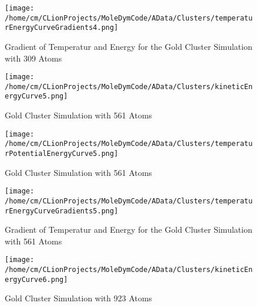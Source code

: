 \begin{figure}[!h] 
    \begin{center} 
        \texttt{[image: /home/cm/CLionProjects/MoleDymCode/AData/Clusters/temperaturEnergyCurveGradients4.png]} 
    \end{center} 
    \caption[Gradient of Temperatur and Energy for the Gold Cluster Simulation with 309 Atoms]{Gradient of Temperatur and Energy for the Gold Cluster Simulation with 309 Atoms} 
    \label{GoldClusterSimulationGradient309} 
\end{figure} 
 
\begin{figure}[!h] 
    \begin{center} 
        \texttt{[image: /home/cm/CLionProjects/MoleDymCode/AData/Clusters/kineticEnergyCurve5.png]} 
    \end{center} 
    \caption[Gold Cluster Simulation with 561 Atoms]{Gold Cluster Simulation with 561 Atoms} 
    \label{GoldClusterSimulationKineticTime561} 
\end{figure} 
 
\begin{figure}[!h] 
    \begin{center} 
        \texttt{[image: /home/cm/CLionProjects/MoleDymCode/AData/Clusters/temperaturPotentialEnergyCurve5.png]} 
    \end{center} 
    \caption[Gold Cluster Simulation with 561 Atoms]{Gold Cluster Simulation with 561 Atoms} 
    \label{GoldClusterSimulationTemperaturEnergy561} 
\end{figure} 
 
\begin{figure}[!h] 
    \begin{center} 
        \texttt{[image: /home/cm/CLionProjects/MoleDymCode/AData/Clusters/temperaturEnergyCurveGradients5.png]} 
    \end{center} 
    \caption[Gradient of Temperatur and Energy for the Gold Cluster Simulation with 561 Atoms]{Gradient of Temperatur and Energy for the Gold Cluster Simulation with 561 Atoms} 
    \label{GoldClusterSimulationGradient561} 
\end{figure} 
 
\begin{figure}[!h] 
    \begin{center} 
        \texttt{[image: /home/cm/CLionProjects/MoleDymCode/AData/Clusters/kineticEnergyCurve6.png]} 
    \end{center} 
    \caption[Gold Cluster Simulation with 923 Atoms]{Gold Cluster Simulation with 923 Atoms} 
    \label{GoldClusterSimulationKineticTime923} 
\end{figure} 
 
